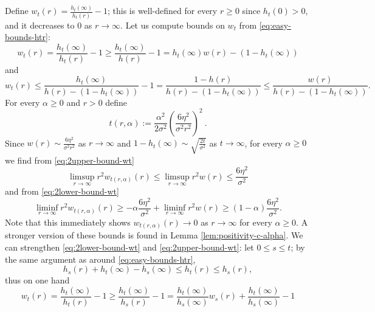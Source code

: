 \documentclass[10pt,a4paper]{article}
\begin{document}
Define $w_t(r) = \frac{h_t(\infty)}{h_t(r)}-1$; this is well-defined for every $r\geq 0$ since $h_t(0)>0$, and it decreases to $0$ as $r\to\infty$. 
Let us compute bounds on $w_t$ from \eqref{eq:easy-bounds-htr}:
\begin{equation}\label{eq:2lower-bound-wt}
w_t(r) = \frac{h_t(\infty)}{h_t(r)}-1 \geq \frac{h_t(\infty)}{h(r)}-1 = h_t(\infty) w(r) - (1-h_t(\infty)) 
\end{equation}
and 
\begin{equation}\label{eq:2upper-bound-wt}
w_t(r) \leq \frac{h_t(\infty)}{h(r) -(1- h_t(\infty))}-1 = \frac{1-h(r)}{h(r)-(1-h_t(\infty))} \leq \frac{w(r)}{h(r) - (1-h_t(\infty))} .
\end{equation}
For every $\alpha\geq 0$ and $r>0$ define
\begin{equation}\label{eq:def-t-r-alpha}
t(r, \alpha) := \frac{\alpha^2}{2\sigma^2} \left( \frac{6\eta^2}{\sigma^2 r^2} \right)^2 \ .
\end{equation}
Since $w(r) \sim \frac{6\eta^2}{\sigma^2 r^2}$ as $r\to\infty$ and $1-h_t(\infty) \sim \sqrt{\frac{2t}{\sigma^2}}$ as $t\to\infty$, for every $\alpha\geq 0$ we find from \eqref{eq:2upper-bound-wt} %
\begin{equation*}%
\limsup_{r\to\infty} r^2 w_{t(r,\alpha)}(r) \leq \limsup_{r\to\infty} r^2 w(r) \leq \frac{6\eta^2}{\sigma^2} 
\end{equation*}
and from \eqref{eq:2lower-bound-wt}
\begin{equation}\label{eq:2bound-w-liminf-1-alpha}
\liminf_{r\to\infty} r^2 w_{t(r,\alpha)}(r) \geq -\alpha\frac{6\eta^2}{\sigma^2} + \liminf_{r\to\infty} r^2 w(r) \geq (1-\alpha) \frac{6\eta^2}{\sigma^2} .
\end{equation}
Note that this immediately shows $w_{t(r,\alpha)}(r)\to 0$ as $r\to\infty$ for every $\alpha\geq 0$. 
A stronger version of these bounds is found in Lemma \ref{lem:positivity-c-alpha}. We can strengthen \eqref{eq:2lower-bound-wt} and \eqref{eq:2upper-bound-wt}: 
let $0\leq s \leq t$; by the same argument as around \eqref{eq:easy-bounds-htr}, 
\[ h_s(r) + h_t(\infty) - h_s(\infty) \leq h_t(r) \leq h_s(r) , \]
thus on one hand
\begin{equation}\label{eq:2lower-bound-wt-strong}
w_t(r) = \frac{h_t(\infty)}{h_t(r)} - 1 \geq \frac{h_t(\infty)}{h_s(r)}-1 = \frac{h_t(\infty)}{h_s(\infty)} w_s(r) + \frac{h_t(\infty)}{h_s(\infty)} - 1
\end{equation}
\end{document}
